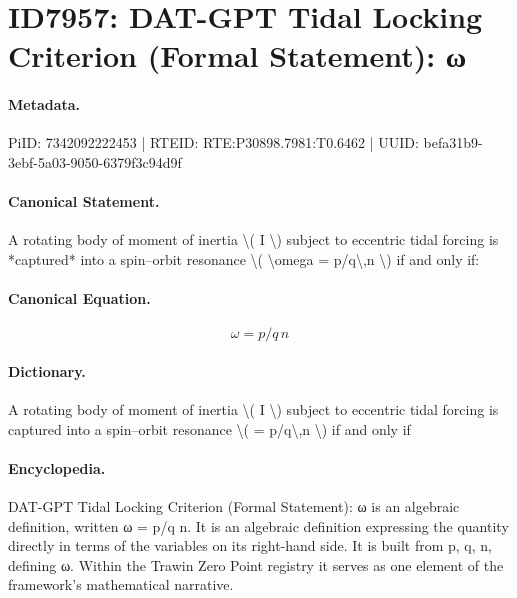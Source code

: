 \section*{ID7957: DAT-GPT Tidal Locking Criterion (Formal Statement): ω}
\paragraph{Metadata.}
PiID: 7342092222453 | RTEID: RTE:P30898.7981:T0.6462 | UUID: befa31b9-3ebf-5a03-9050-6379f3c94d9f

\paragraph{Canonical Statement.}
A rotating body of moment of inertia \textbackslash{}( I \textbackslash{}) subject to eccentric tidal forcing is *captured* into a spin–orbit resonance \textbackslash{}( \textbackslash{}omega = p/q\textbackslash{},n \textbackslash{}) if and only if:

\paragraph{Canonical Equation.}
\[
\omega = p/q\,n
\]

\paragraph{Dictionary.}
A rotating body of moment of inertia \textbackslash{}( I \textbackslash{}) subject to eccentric tidal forcing is captured into a spin–orbit resonance \textbackslash{}( = p/q\textbackslash{},n \textbackslash{}) if and only if

\paragraph{Encyclopedia.}
DAT-GPT Tidal Locking Criterion (Formal Statement): ω is an algebraic definition, written ω = p/q n. It is an algebraic definition expressing the quantity directly in terms of the variables on its right-hand side. It is built from p, q, n, defining ω. Within the Trawin Zero Point registry it serves as one element of the framework's mathematical narrative.

